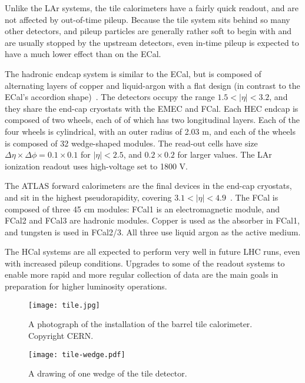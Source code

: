 Unlike the LAr systems, the tile calorimeters have a fairly quick readout, and are not affected by out-of-time pileup. Because the tile system sits behind so many other detectors, and pileup particles are generally rather soft to begin with and are usually stopped by the upstream detectors, even in-time pileup is expected to have a much lower effect than on the ECal.

The hadronic endcap system is similar to the ECal, but is composed of alternating layers of copper and liquid-argon with a flat design (in contrast to the ECal's accordion shape)~\cite{ATLASPaper}. The detectors occupy the range $1.5 < |\eta| < 3.2$, and they share the end-cap cryostats with the EMEC and FCal.  Each HEC endcap is composed of two wheels, each of of which has two longitudinal layers. Each of the four wheels is cylindrical, with an outer radius of 2.03 m, and each of the wheels is composed of 32 wedge-shaped modules. The read-out cells have size $\Delta \eta \times \Delta\phi = 0.1 \times 0.1$ for $|\eta| < 2.5$, and $0.2 \times 0.2$ for larger values. The LAr ionization readout uses high-voltage set to 1800 V.

The ATLAS forward calorimeters are the final devices in the end-cap cryostats, and sit in the highest pseudorapidity, covering $3.1 < |\eta| < 4.9$~\cite{ATLASPaper}. The FCal is composed of three 45 cm modules: FCal1 is an electromagnetic module, and FCal2 and FCal3 are hadronic modules. Copper is used as the absorber in FCal1, and tungsten is used in FCal2/3. All three use liquid argon as the active medium.

The HCal systems are all expected to perform very well in future LHC runs, even with increased pileup conditions. Upgrades to some of the readout systems to enable more rapid and more regular collection of data are the main goals in preparation for higher luminosity operations.



\begin{figure}
\centering
\texttt{[image: tile.jpg]}
\label{fig:detector:barrel-tile}
\caption{A photograph of the installation of the barrel tile calorimeter. Copyright CERN.}
\end{figure}



\begin{figure}
\centering
\texttt{[image: tile-wedge.pdf]}
\label{fig:detector:tile-wedge}
\caption{A drawing of one wedge of the tile detector.}
\end{figure}

